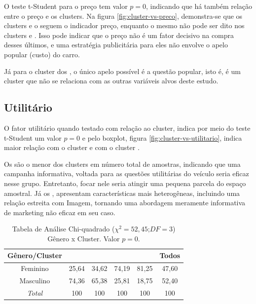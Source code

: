O teste t-Student para o preço tem valor $p=0$, indicando que há também relação
entre o preço e os clusters. Na figura \ref{fig:cluster-vs-preco},
demonstra-se que os clusters \emph{\nomeCa{}} e o \emph{\nomeCc{}}
seguem o indicador preço, enquanto o mesmo não pode ser dito nos
clusters \emph{\nomeCb{}} e \emph{\nomeCd{}}. Isso pode indicar que o preço não
é um fator decisivo na compra desses últimos, e uma estratégia publicitária
para eles não envolve o apelo popular (custo) do carro.

Já para o cluster dos \emph{\nomeCc{}}, o único apelo possível é a questão
popular, isto é, é um cluster que não se relaciona com as outras variáveis
alvos deste estudo.

\subsection{Utilitário}

O fator utilitário quando testado com relação ao cluster, indica por
meio do teste t-Student um valor $p=0$ e pelo boxplot, figura \ref{fig:cluster-vs-utilitario},
indica maior relação com o cluster \emph{\nomeCd{}} e com o cluster
\emph{\nomeCa{}}. 

Os \emph{\nomeCd{}} são o menor dos clusters em número total de amostras,
indicando que uma campanha informativa, voltada para as questões utilitárias
do veículo seria eficaz nesse grupo. Entretanto, focar nele seria
atingir uma pequena parcela do espaço amostral. Já os \emph{\nomeCa{}},
apresentam características mais heterogêneas, incluindo uma relação
estreita com Imagem, tornando uma abordagem meramente informativa
de marketing não eficaz em seu caso. 

\begin{table}
\begin{centering}
\begin{tabular}{c|c|c|c|c|c}
\hline 
Gênero/Cluster & \nomeCa{} & \nomeCb{} & \nomeCc{} & \nomeCd{} & Todos\tabularnewline
\hline 
Feminino & 25,64 & 34,62 & 74,19 & 81,25 & 47,60\tabularnewline
\hline 
Masculino & 74,36 & 65,38 & 25,81 & 18,75 & 52,40\tabularnewline
\hline 
\emph{Total} & 100 & 100 & 100 & 100 & 100\tabularnewline
\hline 
\end{tabular}
\par\end{centering}

\caption{\label{tab:genero-vs-cluster}Tabela de Análise Chi-quadrado ($\chi^{2}=52,45$;$DF=3$)
Gênero x Cluster. Valor $p=0$.}
\end{table}

